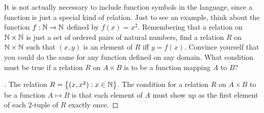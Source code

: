 \begin{ex}\label{ex:1.2.8}
  It is not actually necessary to include function symbols in the language, since a function is just a special kind of relation.
  Just to see an example, think about the function \(f : \mathbb{N} \to \mathbb{N}\) defined by \(f(x) = x^2\).
  Remembering that a relation on \(\mathbb{N} \times \mathbb{N}\) is just a set of ordered pairs of natural numbers, find a relation \(R\) on \(\mathbb{N} \times \mathbb{N}\) such that \((x, y)\) is an element of \(R\) iff \(y = f(x)\).
  Convince yourself that you could do the same for any function defined on any domain.
  What condition must be true if a relation \(R\) on \(A \times B\) is to be a function mapping \(A\) to \(B\)?
\end{ex}

\begin{proof}[]
  The relation \(R = \left\lbrace(x, x^2) : x \in \mathbb{N}\right\rbrace\).
  The condition for a relation \(R\) on \(A \times B\) to be a function \(A \mapsto B\) is that each element of \(A\) must show up as the first element of each \(2\)-tuple of \(R\) exactly once.
\end{proof}
